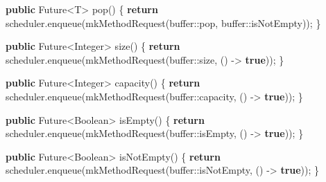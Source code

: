 \documentclass[11pt]{article}
\newenvironment{Shaded}{}{}
\newcommand{\KeywordTok}[1]{\textcolor[rgb]{0.00,0.44,0.13}{\textbf{{#1}}}}
\newcommand{\FunctionTok}[1]{\textcolor[rgb]{0.02,0.16,0.49}{{#1}}}
\newcommand{\NormalTok}[1]{{#1}}
\newcommand{\ControlFlowTok}[1]{\textcolor[rgb]{0.00,0.44,0.13}{\textbf{{#1}}}}
\newcommand{\OperatorTok}[1]{\textcolor[rgb]{0.40,0.40,0.40}{{#1}}}
\newcommand{\BuiltInTok}[1]{{#1}}
\begin{document}
\begin{Shaded}
\begin{Highlighting}[]
    \KeywordTok{public} \BuiltInTok{Future}\OperatorTok{\textless{}}\NormalTok{T}\OperatorTok{\textgreater{}} \FunctionTok{pop}\OperatorTok{()} \OperatorTok{\{}
        \ControlFlowTok{return}\NormalTok{ scheduler}\OperatorTok{.}\FunctionTok{enqueue}\OperatorTok{(}\FunctionTok{mkMethodRequest}\OperatorTok{(}\NormalTok{buffer}\OperatorTok{::}\NormalTok{pop}\OperatorTok{,}\NormalTok{ buffer}\OperatorTok{::}\NormalTok{isNotEmpty}\OperatorTok{));}
    \OperatorTok{\}}

    \KeywordTok{public} \BuiltInTok{Future}\OperatorTok{\textless{}}\BuiltInTok{Integer}\OperatorTok{\textgreater{}} \FunctionTok{size}\OperatorTok{()} \OperatorTok{\{}
        \ControlFlowTok{return}\NormalTok{ scheduler}\OperatorTok{.}\FunctionTok{enqueue}\OperatorTok{(}\FunctionTok{mkMethodRequest}\OperatorTok{(}\NormalTok{buffer}\OperatorTok{::}\NormalTok{size}\OperatorTok{,} \OperatorTok{()} \OperatorTok{{-}\textgreater{}} \KeywordTok{true}\OperatorTok{));}
    \OperatorTok{\}}

    \KeywordTok{public} \BuiltInTok{Future}\OperatorTok{\textless{}}\BuiltInTok{Integer}\OperatorTok{\textgreater{}} \FunctionTok{capacity}\OperatorTok{()} \OperatorTok{\{}
        \ControlFlowTok{return}\NormalTok{ scheduler}\OperatorTok{.}\FunctionTok{enqueue}\OperatorTok{(}\FunctionTok{mkMethodRequest}\OperatorTok{(}\NormalTok{buffer}\OperatorTok{::}\NormalTok{capacity}\OperatorTok{,} \OperatorTok{()} \OperatorTok{{-}\textgreater{}} \KeywordTok{true}\OperatorTok{));}
    \OperatorTok{\}}

    \KeywordTok{public} \BuiltInTok{Future}\OperatorTok{\textless{}}\BuiltInTok{Boolean}\OperatorTok{\textgreater{}} \FunctionTok{isEmpty}\OperatorTok{()} \OperatorTok{\{}
        \ControlFlowTok{return}\NormalTok{ scheduler}\OperatorTok{.}\FunctionTok{enqueue}\OperatorTok{(}\FunctionTok{mkMethodRequest}\OperatorTok{(}\NormalTok{buffer}\OperatorTok{::}\NormalTok{isEmpty}\OperatorTok{,} \OperatorTok{()} \OperatorTok{{-}\textgreater{}} \KeywordTok{true}\OperatorTok{));}
    \OperatorTok{\}}

    \KeywordTok{public} \BuiltInTok{Future}\OperatorTok{\textless{}}\BuiltInTok{Boolean}\OperatorTok{\textgreater{}} \FunctionTok{isNotEmpty}\OperatorTok{()} \OperatorTok{\{}
        \ControlFlowTok{return}\NormalTok{ scheduler}\OperatorTok{.}\FunctionTok{enqueue}\OperatorTok{(}\FunctionTok{mkMethodRequest}\OperatorTok{(}\NormalTok{buffer}\OperatorTok{::}\NormalTok{isNotEmpty}\OperatorTok{,} \OperatorTok{()} \OperatorTok{{-}\textgreater{}} \KeywordTok{true}\OperatorTok{));}
    \OperatorTok{\}}


\end{Highlighting}
\end{Shaded}
\end{document}
